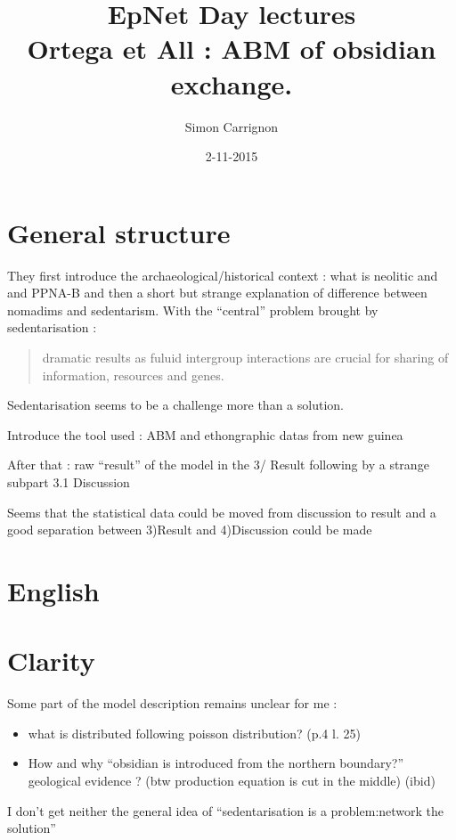 \documentclass[a4paper]{article}
\title{EpNet Day lectures\\
Ortega et All : ABM of obsidian exchange.
}
\author{Simon Carrignon}
\date{2-11-2015}
\begin{document}
\maketitle

\section{General structure}

They first introduce the archaeological/historical context : what is neolitic and and PPNA-B and then a short but strange explanation of difference between nomadims and sedentarism. With the ``central'' problem brought by sedentarisation : 
\begin{quote}
    dramatic results as fuluid intergroup interactions are crucial for sharing of information, resources and genes.
\end{quote}

Sedentarisation seems to be a challenge more than a solution.

Introduce the tool used : ABM and ethongraphic datas from new guinea

After that : raw ``result'' of the model in the 3/ Result following by a strange subpart 3.1 Discussion

Seems that the statistical data could be moved from discussion to result and a good separation between 3)Result and 4)Discussion could be made
\section{English}

\section{Clarity}

Some part of the model description remains unclear for me : 

\begin{itemize}
    \item what is distributed following poisson distribution?  (p.4 l. 25)
    \item How and why ``obsidian is introduced from the northern boundary?''  geological evidence ? (btw production equation is cut in the middle) (ibid)
\end{itemize}

I don't get neither the general idea of ``sedentarisation is a problem:network the solution''
\end{document}
